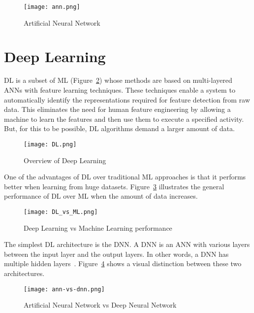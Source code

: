     \begin{figure}[htbp]
        \centering
        \texttt{[image: ann.png]}
        \caption{Artificial Neural Network~\cite{CastrounisAIExplained}}
        \label{fig:ann}
    \end{figure}

\section{Deep Learning}\label{sec:dl}

\gls{DL} is a subset of \gls{ML} (Figure~\ref{fig:DL}) whose methods are based on multi-layered \gls{ANN}s with feature learning techniques. These techniques enable a system to automatically identify the representations required for feature detection from raw data. This eliminates the need for human feature engineering by allowing a machine to learn the features and then use them to execute a specified activity. But, for this to be possible, \gls{DL} algorithms demand a larger amount of data.

\begin{figure}[htbp]
    \centering
    \texttt{[image: DL.png]}
    \caption{Overview of Deep Learning~\cite{Alzubaidi2021ReviewDirections}}
    \label{fig:DL}
\end{figure}

One of the advantages of \gls{DL} over traditional \gls{ML} approaches is that it performs better when learning from huge datasets. Figure~\ref{fig:DL_vs_ML} illustrates the general performance of \gls{DL} over \gls{ML} when the amount of data increases.

\begin{figure}[htbp]
    \centering
    \texttt{[image: DL\_vs\_ML.png]}
    \caption{Deep Learning vs Machine Learning performance~\cite{Alom2019AArchitectures}}
    \label{fig:DL_vs_ML}
\end{figure}

The simplest \gls{DL} architecture is the \gls{DNN}. A \gls{DNN} is an \gls{ANN} with various layers between the input layer and the output layers. In other words, a \gls{DNN} has multiple hidden layers~\cite{Schmidhuber2015DeepOverview}. Figure~\ref{fig:ann-vs-dnn} shows a visual distinction between these two architectures.

\begin{figure}[htbp]
    \centering
    \texttt{[image: ann-vs-dnn.png]}
    \caption{Artificial Neural Network vs Deep Neural Network~\cite{Mostafa2020MachineArticle}}
    \label{fig:ann-vs-dnn}
\end{figure}

